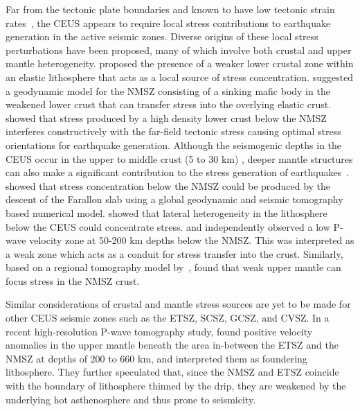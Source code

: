 \documentclass[draft,linenumbers]{agujournal2018}
\begin{document}
    Far from the tectonic plate boundaries and known to have low tectonic strain rates~\citep{Boyd_2015}, the CEUS appears to require local stress contributions to earthquake generation in the active seismic zones. Diverse origins of these local stress perturbations have been proposed, many of which involve both crustal and upper mantle heterogeneity. \citet{Kenner_2000a} proposed the presence of a weaker lower crustal zone within an elastic lithosphere that acts as a local source of stress concentration. \citet{Pollitz_2001} suggested a geodynamic model for the NMSZ consisting of a sinking mafic body in the weakened lower crust that can transfer stress into the overlying elastic crust. \citet{levandowski2016dense} showed that stress produced by a high density lower crust below the NMSZ interferes constructively with the far-field tectonic stress causing optimal stress orientations for earthquake generation.  Although the seismogenic depths in the CEUS occur in the upper to middle crust (5 to 30 km) \citep{vlahovic1998et1d, johnston1996seismic, mazzotti2010state}, deeper mantle structures can also make a significant contribution to the stress generation of  earthquakes~\citep[e.g.,][]{forte2007descent, li2007stress, chen2014crust, nyamwandha2016joint, zhan2016stress}. \citet{forte2007descent} showed that stress concentration below the NMSZ could be produced by the descent of the Farallon slab using a global geodynamic and seismic tomography based numerical model. \citet{li2007stress} showed that lateral heterogeneity in the lithosphere below the CEUS could concentrate stress. \citet{chen2014crust} and \citet{nyamwandha2016joint} independently observed a low P-wave velocity zone at 50-200 km depths below the NMSZ. This was interpreted as a weak zone which acts as a conduit for stress transfer into the crust. Similarly, based on a regional tomography model by~\citet{pollitz2014seismic}, \citet{zhan2016stress} found that weak upper mantle can focus stress in the NMSZ crust.
    
    
Similar considerations of crustal and mantle stress sources are yet to be made for other CEUS seismic zones such as the ETSZ, SCSZ, GCSZ, and CVSZ. In a recent high-resolution P-wave tomography study, \citet{Biryol_2016} found positive velocity anomalies in the upper mantle beneath the area in-between the ETSZ and the NMSZ at depths of 200 to 660 km, and interpreted them as foundering lithosphere. They further speculated that, since the NMSZ and ETSZ coincide with the boundary of lithosphere thinned by the drip, they are weakened by the underlying hot asthenosphere and thus prone to seismicity. 
\end{document}
